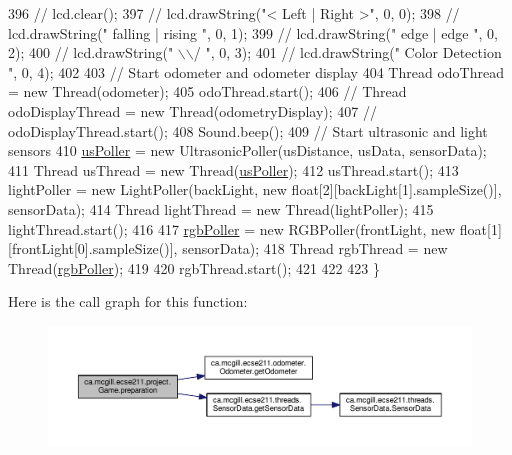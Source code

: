 \begin{DoxyCode}
396 \textcolor{comment}{//    lcd.clear();}
397 \textcolor{comment}{//    lcd.drawString("<  Left  |  Right >", 0, 0);}
398 \textcolor{comment}{//    lcd.drawString(" falling | rising  ", 0, 1);}
399 \textcolor{comment}{//    lcd.drawString("  edge   |  edge   ", 0, 2);}
400 \textcolor{comment}{//    lcd.drawString("        \(\backslash\)\(\backslash\)/        ", 0, 3);}
401 \textcolor{comment}{//    lcd.drawString("  Color Detection  ", 0, 4);}
402 
403     \textcolor{comment}{// Start odometer and odometer display}
404     Thread odoThread = new Thread(odometer);
405     odoThread.start();
406 \textcolor{comment}{//    Thread odoDisplayThread = new Thread(odometryDisplay);}
407 \textcolor{comment}{//    odoDisplayThread.start();}
408     Sound.beep();
409     \textcolor{comment}{// Start ultrasonic and light sensors}
410     \hyperlink{enumca_1_1mcgill_1_1ecse211_1_1project_1_1_game_af6fee74efff891793b32352caa110465}{usPoller} = new UltrasonicPoller(usDistance, usData, sensorData);
411     Thread usThread = new Thread(\hyperlink{enumca_1_1mcgill_1_1ecse211_1_1project_1_1_game_af6fee74efff891793b32352caa110465}{usPoller});
412     usThread.start();
413     lightPoller = new LightPoller(backLight, new \textcolor{keywordtype}{float}[2][backLight[1].sampleSize()], sensorData);
414     Thread lightThread = new Thread(lightPoller);
415     lightThread.start();
416 
417     \hyperlink{enumca_1_1mcgill_1_1ecse211_1_1project_1_1_game_af24a953a0c3438670220dde36c532b5d}{rgbPoller} = new RGBPoller(frontLight, new \textcolor{keywordtype}{float}[1][frontLight[0].sampleSize()], sensorData);
418     Thread rgbThread = new Thread(\hyperlink{enumca_1_1mcgill_1_1ecse211_1_1project_1_1_game_af24a953a0c3438670220dde36c532b5d}{rgbPoller});
419     
420     rgbThread.start();
421     
422    
423   \}
\end{DoxyCode}
Here is the call graph for this function\+:\nopagebreak
\begin{figure}[H]
\begin{center}
\leavevmode
\includegraphics[width=350pt]{enumca_1_1mcgill_1_1ecse211_1_1project_1_1_game_a8f3c5b18f98ee56f5f03afd72fa40bcb_cgraph}
\end{center}
\end{figure}
\mbox{\label{enumca_1_1mcgill_1_1ecse211_1_1project_1_1_game_a032b53e9b16b9d470b461de4a311a698}} 

